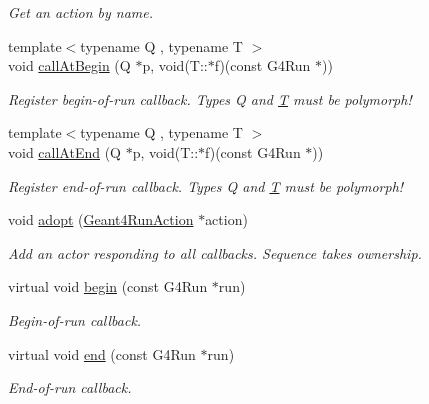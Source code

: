 \begin{DoxyCompactItemize}
\begin{DoxyCompactList}\small\item\em Get an action by name. \item\end{DoxyCompactList}\item 
{\footnotesize template$<$typename Q , typename T $>$ }\\void \hyperlink{class_d_d4hep_1_1_simulation_1_1_geant4_run_action_sequence_a45da17c9f91b5448ce77b99cd44db369}{callAtBegin} (Q $\ast$p, void(T::$\ast$f)(const G4Run $\ast$))
\begin{DoxyCompactList}\small\item\em Register begin-\/of-\/run callback. Types Q and \hyperlink{class_t}{T} must be polymorph! \item\end{DoxyCompactList}\item 
{\footnotesize template$<$typename Q , typename T $>$ }\\void \hyperlink{class_d_d4hep_1_1_simulation_1_1_geant4_run_action_sequence_aeaecc7d36c3d746ccc4902c86c60e3da}{callAtEnd} (Q $\ast$p, void(T::$\ast$f)(const G4Run $\ast$))
\begin{DoxyCompactList}\small\item\em Register end-\/of-\/run callback. Types Q and \hyperlink{class_t}{T} must be polymorph! \item\end{DoxyCompactList}\item 
void \hyperlink{class_d_d4hep_1_1_simulation_1_1_geant4_run_action_sequence_a9daef9eac6020138426b08116710ceaf}{adopt} (\hyperlink{class_d_d4hep_1_1_simulation_1_1_geant4_run_action}{Geant4RunAction} $\ast$action)
\begin{DoxyCompactList}\small\item\em Add an actor responding to all callbacks. Sequence takes ownership. \item\end{DoxyCompactList}\item 
virtual void \hyperlink{class_d_d4hep_1_1_simulation_1_1_geant4_run_action_sequence_a447a8f86614e2a958dcc0761ce89344b}{begin} (const G4Run $\ast$run)
\begin{DoxyCompactList}\small\item\em Begin-\/of-\/run callback. \item\end{DoxyCompactList}\item 
virtual void \hyperlink{class_d_d4hep_1_1_simulation_1_1_geant4_run_action_sequence_a2a21cad772d05ac39502c35e334c6e5f}{end} (const G4Run $\ast$run)
\begin{DoxyCompactList}\small\item\em End-\/of-\/run callback. \item\end{DoxyCompactList}\end{DoxyCompactItemize}
